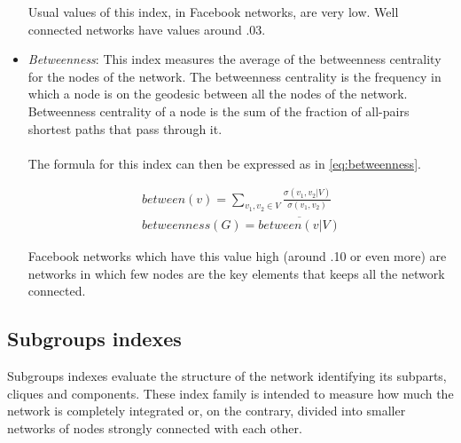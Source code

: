 \begin{itemize}
Usual values of this index, in Facebook networks, are very low.
Well connected networks have values around .03.

\item \emph{Betweenness}: This index measures the average of the betweenness centrality for the nodes of the network.
The betweenness centrality is the frequency in which a node is on the geodesic between all the nodes of the network.
Betweenness centrality of a node is the sum of the fraction of all-pairs shortest paths that pass through it.\\
\\
The formula for this index can then be expressed as in \ref{eq:betweenness}.

\begin{equation}
\begin{split}
between(v) = \sum_{v_{1},v_{2} \in V} \frac{\sigma(v_{1}, v_{2}|V)}{\sigma(v_{1}, v_{2})} \\
betweenness(G) = \overline{between(v | V)}
\end{split}
\label{eq:betweenness}
\end{equation}

Facebook networks which have this value high (around .10 or even more) are networks in which few nodes are the key elements that keeps all the network connected.
\end{itemize}

\label{sec:subgroupsindexes}
\subsection{Subgroups indexes}
Subgroups indexes evaluate the structure of the network identifying its subparts, cliques and components.
These index family is intended to measure how much the network is completely integrated or, on the contrary, divided into smaller networks of nodes strongly connected
with each other.

